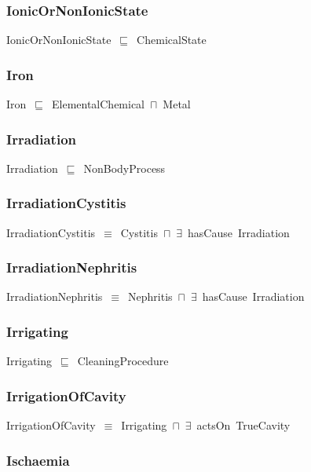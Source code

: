 \documentclass{article}
\begin{document}
\subsubsection*{IonicOrNonIonicState}

IonicOrNonIonicState~\ensuremath{\sqsubseteq}~ChemicalState~

\subsubsection*{Iron}

Iron~\ensuremath{\sqsubseteq}~ElementalChemical~\ensuremath{\sqcap}~Metal~

\subsubsection*{Irradiation}

Irradiation~\ensuremath{\sqsubseteq}~NonBodyProcess~

\subsubsection*{IrradiationCystitis}

IrradiationCystitis~\ensuremath{\equiv}~Cystitis~\ensuremath{\sqcap}~\ensuremath{\exists}~hasCause~Irradiation

\subsubsection*{IrradiationNephritis}

IrradiationNephritis~\ensuremath{\equiv}~Nephritis~\ensuremath{\sqcap}~\ensuremath{\exists}~hasCause~Irradiation

\subsubsection*{Irrigating}

Irrigating~\ensuremath{\sqsubseteq}~CleaningProcedure~

\subsubsection*{IrrigationOfCavity}

IrrigationOfCavity~\ensuremath{\equiv}~Irrigating~\ensuremath{\sqcap}~\ensuremath{\exists}~actsOn~TrueCavity

\subsubsection*{Ischaemia}
\end{document}

